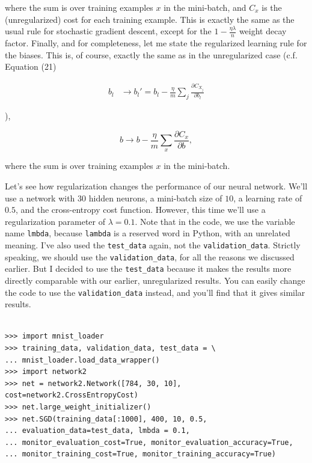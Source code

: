 \noindent where the sum is over training examples $x$ in the mini-batch, and $C_x$ is the (unregularized) cost for each training example. This is exactly the same as the usual rule for stochastic gradient descent, except for the $1-\frac{\eta \lambda}{n}$ weight decay factor. Finally, and for completeness, let me state the regularized learning rule for the biases. This is, of course, exactly the same as in the unregularized case (c.f. Equation (21)

\begin{align*}
b_l &\rightarrow b_l' = b_l-\frac{\eta}{m} \sum_j \frac{\partial C_{X_j}}{\partial b_l} \nonumber
\end{align*}

\noindent ),

\begin{equation}
b \rightarrow b - \frac{\eta}{m} \sum_x \frac{\partial C_x}{\partial b},
\tag{94}
\end{equation}

\noindent where the sum is over training examples $x$ in the mini-batch.


Let's see how regularization changes the performance of our neural network. We'll use a network with $30$ hidden neurons, a mini-batch size of $10$, a learning rate of $0.5$, and the cross-entropy cost function. However, this time we'll use a regularization parameter of $\lambda = 0.1$. Note that in the code, we use the variable name \texttt{lmbda}, because \texttt{lambda} is a reserved word in Python, with an unrelated meaning. I've also used the \texttt{test\_\allowbreak{}data} again, not the \texttt{validation\_\allowbreak{}data}. Strictly speaking, we should use the \texttt{validation\_\allowbreak{}data}, for all the reasons we discussed earlier. But I decided to use the \texttt{test\_\allowbreak{}data} because it makes the results more directly comparable with our earlier, unregularized results. You can easily change the code to use the \texttt{validation\_\allowbreak{}data} instead, and you'll find that it gives similar results.



\begin{lstlisting}
 
>>> import mnist_loader 
>>> training_data, validation_data, test_data = \
... mnist_loader.load_data_wrapper() 
>>> import network2 
>>> net = network2.Network([784, 30, 10], cost=network2.CrossEntropyCost)
>>> net.large_weight_initializer()
>>> net.SGD(training_data[:1000], 400, 10, 0.5,
... evaluation_data=test_data, lmbda = 0.1,
... monitor_evaluation_cost=True, monitor_evaluation_accuracy=True,
... monitor_training_cost=True, monitor_training_accuracy=True)

\end{lstlisting}


